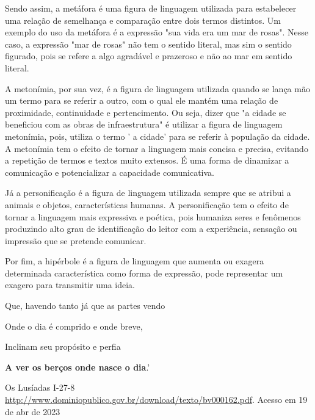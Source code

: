 {{\begin{escolha}
{Sendo assim, a metáfora é uma figura de linguagem utilizada para
estabelecer uma relação de semelhança e comparação entre dois termos
distintos. Um exemplo do uso da metáfora é a expressão "sua vida era um
mar de rosas". Nesse caso, a expressão "mar de rosas" não tem o sentido
literal, mas sim o sentido figurado, pois se refere a algo agradável e
prazeroso e não ao mar em sentido literal.

A metonímia, por sua vez, é a figura de linguagem utilizada quando se
lança mão um termo para se referir a outro, com o qual ele mantém uma
relação de proximidade, continuidade e pertencimento. Ou seja, dizer que
"a cidade se beneficiou com as obras de infraestrutura" é utilizar a
figura de linguagem metonímia, pois, utiliza o termo ' a cidade' para se
referir à população da cidade. A metonímia tem o efeito de tornar a
linguagem mais concisa e precisa, evitando a repetição de termos e
textos muito extensos. É uma forma de dinamizar a comunicação e
potencializar a capacidade comunicativa.

Já a personificação é a figura de linguagem utilizada sempre que se
atribui a animais e objetos, características humanas. A personificação
tem o efeito de tornar a linguagem mais expressiva e poética, pois
humaniza seres e fenômenos produzindo alto grau de identificação do
leitor com a experiência, sensação ou impressão que se pretende
comunicar.

Por fim, a hipérbole é a figura de linguagem que aumenta ou exagera
determinada característica como forma de expressão, pode representar um
exagero para transmitir uma ideia.



Que, havendo tanto já que as partes vendo

Onde o dia é comprido e onde breve,

Inclinam seu propósito e perfia

\textbf{A ver os berços onde nasce o dia}.'

Os Lusíadas I-27-8
\href{http://www.dominiopublico.gov.br/download/texto/bv000162.pdf}{\uline{http://www.dominiopublico.gov.br/download/texto/bv000162.pdf}}.
Acesso em 19 de abr de 2023

}
\end{escolha}}}
